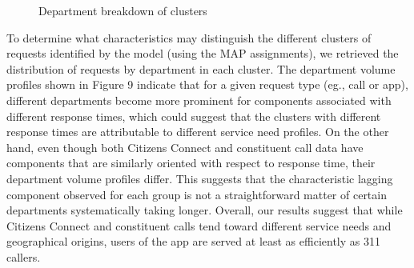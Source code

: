 \documentclass[twoside]{article}
\theoremstyle{theorem}
\theoremstyle{theorem}
\theoremstyle{theorem}
\theoremstyle{lemma}
\theoremstyle{definition}
\theoremstyle{example}
\begin{document}
\begin{figure}
\begin{center} \label{profiles}
\caption{Department breakdown of clusters}
\hskip1cm
\end{center}
\vskip -0.2in
\end{figure} 

To determine what characteristics may distinguish the different clusters of requests identified by the model (using the MAP assignments), we retrieved the distribution of requests by department in each cluster. The department volume profiles shown in Figure 9 indicate that for a given request type (eg., call or app), different departments become more prominent for components associated with different response times, which could suggest that the clusters with different response times are attributable to different service need profiles. On the other hand, even though both Citizens Connect and constituent call data have components that are similarly oriented with respect to response time, their department volume profiles differ. This suggests that the characteristic lagging component observed for each group is not a straightforward matter of certain departments systematically taking longer.  Overall, our results suggest that while Citizens Connect and constituent calls tend toward different service needs and geographical origins, users of the app are served at least as efficiently as 311 callers.




\end{document}
